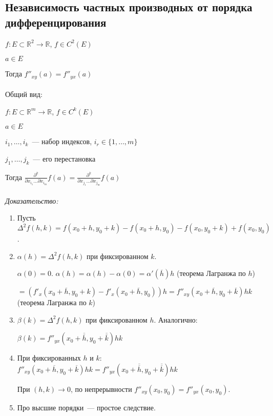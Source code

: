 \documentclass[paper=a4, fontsize=11pt]{article}
\begin{document}
\subsection{Независимость частных производных от порядка дифференцирования}
$f: E \subset \mathds{R}^2 \rightarrow \mathds{R}$, $f \in C^2(E)$

$a \in E$

Тогда $f''_{xy}(a) = f''_{yx}(a)$
\\\\
Общий вид:

$f: E \subset \mathds{R}^m \rightarrow \mathds{R}$, $f \in C^k(E)$

$a \in E$

$i_1,\dots,i_k$~--- набор индексов, $i_r \in \{1,\dots,m\}$

$j_1,\dots,j_k$~--- его перестановка

Тогда $\frac{\partial^k}{\partial x_{i_1}\dots \partial x_{i_m}}f(a) = \frac{\partial^k}{\partial x_{j_1}\dots \partial x_{j_m}}f(a)$
\\\\
\emph{Доказательство:}
\begin{enumerate}
    \item Пусть $\Delta^2 f(h,k) = f(x_0+h,y_0+k) - f(x_0+h,y_0) - f(x_0,y_0+k) + f(x_0,y_0)$.
    \item $\alpha(h) = \Delta^2 f(h,k)$ при фиксированном $k$.

    $\alpha(0) = 0$. $\alpha(h) = \alpha(h) - \alpha(0) = \alpha'(\overline{h})h$ (теорема Лагранжа по $h$)
    
    $= (f'_x(x_0+\overline{h},y_0+k)-f'_x(x_0+\overline{h},y_0))h =
    f''_{xy}(x_0+\overline{h},y_0+\overline{k})hk$ (теорема Лагранжа по $k$)

    \item $\beta(k) = \Delta^2 f(h,k)$ при фиксированном $h$. Аналогично:
    
    $\beta(k) = f''_{yx}(x_0+\overline{\overline{h}},y_0+\overline{\overline{k}})hk$

    \item При фиксированных $h$ и $k$:
    $f''_{xy}(x_0+\overline{h},y_0+\overline{k})hk = f''_{yx}(x_0+\overline{\overline{h}},y_0+\overline{\overline{k}})hk$

    При $(h,k) \to 0$, по непрерывности $f''_{xy}(x_0,y_0) = f''_{yx}(x_0,y_0)$.

    \item Про высшие порядки~--- простое следствие.
\end{enumerate}
\end{document}
